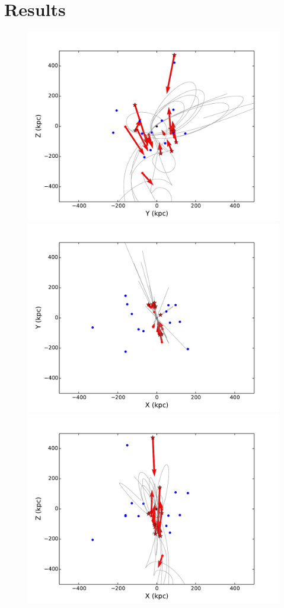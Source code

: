\documentclass[useAMS,usenatbib]{mn2e}
\begin{document}
\section{Results}
\label{Results}
\begin{figure}
\centering
\includegraphics[width=\hsize]{SnapshotSatellites_All_BeforeRotationM300_yz_All_Fwd_NSIMW_3000.pdf}\\
\includegraphics[width=0.5\hsize]{SnapshotSatellites_All_BeforeRotationM300_xy_All_Fwd_NSIMW_3000.pdf}\includegraphics[width=0.5\hsize]{SnapshotSatellites_All_BeforeRotationM300_xz_All_Fwd_NSIMW_3000.pdf}\\

\end{figure}
\end{document}

